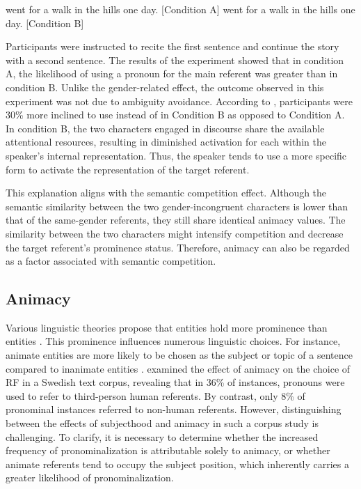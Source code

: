 \begin{exe}
	\ex 
	\begin{xlist}
		\ex {} went for a walk in the hills one day. [Condition A]
		\ex {} went for a walk  in the hills one day. [Condition B]
	\end{xlist}
\end{exe}

Participants were instructed to recite the first sentence and continue the story with a second sentence. 
The results of the experiment showed that in condition A, the likelihood of using a pronoun for the main referent was greater than in condition B. Unlike the gender-related effect, the outcome observed in this experiment was not due to ambiguity avoidance. 
According to \citet{arnold2007effect}, participants were 30\% more inclined to use  instead of  in Condition B as opposed to Condition A. In condition B, the two characters engaged in discourse share the available attentional resources, resulting in diminished activation for each within the speaker's internal representation. Thus, the speaker tends to use a more specific form to activate the representation of the target referent.

This explanation aligns with the semantic competition effect. Although the semantic similarity between the two gender-incongruent characters is lower than that of the same-gender referents, they still share identical animacy values. 
The similarity between the two characters might intensify competition and decrease the target referent's prominence status. Therefore, animacy can also be regarded as a factor associated with semantic competition.

\subsection{Animacy}\label{subsec:animacy}
Various linguistic theories propose that  entities hold more prominence than  entities \citep{comrie1989language,Aissen2003}. This prominence influences numerous linguistic choices. For instance, animate entities are more likely to be chosen as the subject or topic of a sentence compared to inanimate entities \citep{Givon1983,Dahl1996}. \citet{Dahl1996} examined the effect of animacy on the choice of RF in a Swedish text corpus, revealing that in 36\% of instances, pronouns were used to refer to third-person human referents. By contrast, only 8\% of pronominal instances referred to non-human referents. However, distinguishing between the effects of subjecthood and animacy in such a corpus study is challenging. To clarify, it is necessary to determine whether the increased frequency of pronominalization is attributable solely to animacy, or whether animate referents tend to occupy the subject position, which inherently carries a greater likelihood of pronominalization.

